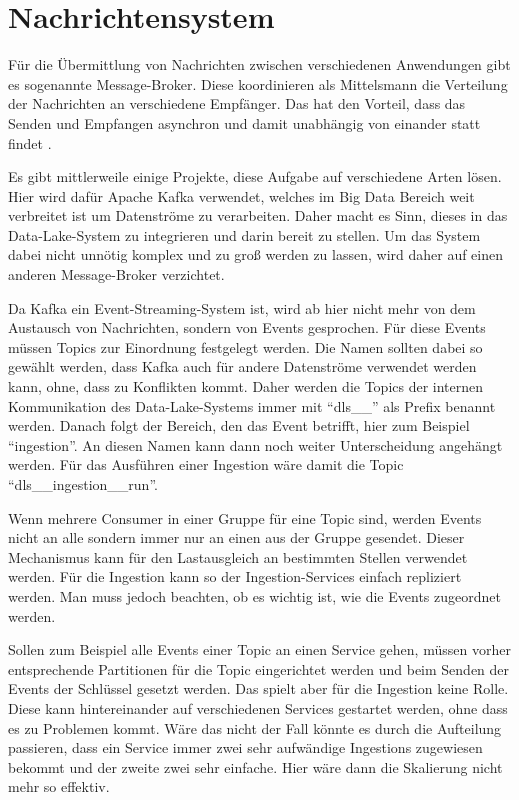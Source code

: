 \section{Nachrichtensystem}

Für die Übermittlung von Nachrichten zwischen verschiedenen Anwendungen gibt es sogenannte Message-Broker.
Diese koordinieren als Mittelsmann die Verteilung der Nachrichten an verschiedene Empfänger.
Das hat den Vorteil, dass das Senden und Empfangen asynchron und damit unabhängig von einander statt findet \parencite{message-broker}.

Es gibt mittlerweile einige Projekte, diese Aufgabe auf verschiedene Arten lösen.
Hier wird dafür Apache Kafka verwendet, welches im Big Data Bereich weit verbreitet ist um Datenströme zu verarbeiten.
Daher macht es Sinn, dieses in das Data-Lake-System zu integrieren und darin bereit zu stellen.
Um das System dabei nicht unnötig komplex und zu groß werden zu lassen, wird daher auf einen anderen Message-Broker verzichtet.

Da Kafka ein Event-Streaming-System ist, wird ab hier nicht mehr von dem Austausch von Nachrichten, sondern von Events gesprochen.
Für diese Events müssen Topics zur Einordnung festgelegt werden.
Die Namen sollten dabei so gewählt werden, dass Kafka auch für andere Datenströme verwendet werden kann, ohne, dass zu Konflikten kommt.
Daher werden die Topics der internen Kommunikation des Data-Lake-Systems immer mit "`dls\_\_"' als Prefix benannt werden.
Danach folgt der Bereich, den das Event betrifft, hier zum Beispiel "`ingestion"'.
An diesen Namen kann dann noch weiter Unterscheidung angehängt werden.
Für das Ausführen einer Ingestion wäre damit die Topic "`dls\_\_ingestion\_\_run"'.

Wenn mehrere Consumer in einer Gruppe für eine Topic sind, werden Events nicht an alle sondern immer nur an einen aus der Gruppe gesendet.
Dieser Mechanismus kann für den Lastausgleich an bestimmten Stellen verwendet werden.
Für die Ingestion kann so der Ingestion-Services einfach repliziert werden.
Man muss jedoch beachten, ob es wichtig ist, wie die Events zugeordnet werden.

Sollen zum Beispiel alle Events einer Topic an einen Service gehen, müssen vorher entsprechende Partitionen für die Topic eingerichtet werden und beim Senden der Events der Schlüssel gesetzt werden.
Das spielt aber für die Ingestion keine Rolle.
Diese kann hintereinander auf verschiedenen Services gestartet werden, ohne dass es zu Problemen kommt.
Wäre das nicht der Fall könnte es durch die Aufteilung passieren, dass ein Service immer zwei sehr aufwändige Ingestions zugewiesen bekommt und der zweite zwei sehr einfache.
Hier wäre dann die Skalierung nicht mehr so effektiv.